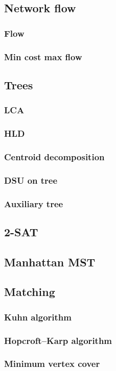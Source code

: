 \subsection{Network flow}
  \subsubsection{Flow}
  \subsubsection{Min cost max flow}

\subsection{Trees}
  \subsubsection{LCA}
  \subsubsection{HLD}
  \subsubsection{Centroid decomposition}
  \subsubsection{DSU on tree}
  \subsubsection{Auxiliary tree}

\subsection{2-SAT}

\subsection{Manhattan MST}

\subsection{Matching}
  \subsubsection{Kuhn algorithm}
  \subsubsection{Hopcroft–Karp algorithm}
  \subsubsection{Minimum vertex cover}
